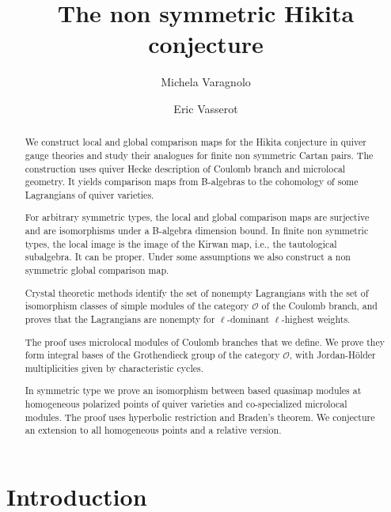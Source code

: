 \documentclass[11pt,reqno]{amsart}
\title{The non symmetric Hikita conjecture}
\date{}
\author{Michela Varagnolo}
\author{Eric Vasserot}
\theoremstyle{definition}
\theoremstyle{remark}
\def\scrO{\mathscr O}
\begin{document}
\begin{abstract}
We construct local and global comparison maps for the Hikita
conjecture in quiver gauge theories and study their analogues
for finite non symmetric Cartan pairs. 
The construction uses quiver Hecke description
of Coulomb branch and microlocal geometry.
It yields comparison maps from  B-algebras to the cohomology of
some Lagrangians of quiver varieties. 

For arbitrary symmetric types,  the local and global comparison maps are surjective and
are isomorphisms under a B-algebra dimension bound.
In finite non symmetric types, the local image is the image of the Kirwan map, i.e., the tautological subalgebra. 
It can be proper. Under some assumptions we also
construct a non symmetric global comparison map.

Crystal theoretic methods identify the set of  nonempty Lagrangians with the set of isomorphism classes of
simple modules of the category $\scrO$ of the Coulomb branch, and 
proves that the Lagrangians are nonempty for 
$\ell$-dominant $\ell$-highest weights. 

The proof uses microlocal modules of Coulomb branches that we define.
We prove they form integral bases of the Grothendieck group of the category $\scrO$, 
with Jordan-H\"older multiplicities given by characteristic cycles. 

In symmetric
type we prove an isomorphism between based quasimap
modules at homogeneous polarized points of quiver varieties and co-specialized microlocal
modules. The proof uses hyperbolic restriction and Braden's theorem. We conjecture an extension to all
homogeneous points and a relative version.
\end{abstract}



\maketitle
\setcounter{tocdepth}{1}
\tableofcontents

\section{Introduction}
\end{document}
